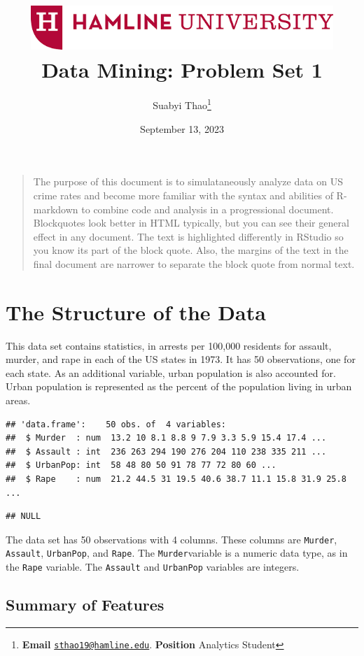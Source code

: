 \documentclass[
  12pt,
]{article}
\title{\includegraphics[width=4.5in,height=\textheight]{long_logo.png}\\
Data Mining: Problem Set 1}
\author{Suabyi Thao\footnote{\textbf{Email}
  \href{mailto:sthao19@hamline.edu}{\nolinkurl{sthao19@hamline.edu}}.
  \textbf{Position} Analytics Student}}
\date{September 13, 2023}
\begin{document}
\maketitle

\begin{quote}
The purpose of this document is to simulataneously analyze data on US
crime rates and become more familiar with the syntax and abilities of
R-markdown to combine code and analysis in a progressional document.
Blockquotes look better in HTML typically, but you can see their general
effect in any document. The text is highlighted differently in RStudio
so you know its part of the block quote. Also, the margins of the text
in the final document are narrower to separate the block quote from
normal text.
\end{quote}

\hypertarget{the-structure-of-the-data}{%
\section{The Structure of the Data}\label{the-structure-of-the-data}}

This data set contains statistics, in arrests per 100,000 residents for
assault, murder, and rape in each of the US states in 1973. It has 50
observations, one for each state. As an additional variable, urban
population is also accounted for. Urban population is represented as the
percent of the population living in urban areas.

\begin{verbatim}
## 'data.frame':    50 obs. of  4 variables:
##  $ Murder  : num  13.2 10 8.1 8.8 9 7.9 3.3 5.9 15.4 17.4 ...
##  $ Assault : int  236 263 294 190 276 204 110 238 335 211 ...
##  $ UrbanPop: int  58 48 80 50 91 78 77 72 80 60 ...
##  $ Rape    : num  21.2 44.5 31 19.5 40.6 38.7 11.1 15.8 31.9 25.8 ...
\end{verbatim}

\begin{verbatim}
## NULL
\end{verbatim}

The data set has 50 observations with 4 columns. These columns are
\texttt{Murder}, \texttt{Assault}, \texttt{UrbanPop}, and \texttt{Rape}.
The \texttt{Murder}variable is a numeric data type, as in the
\texttt{Rape} variable. The \texttt{Assault} and \texttt{UrbanPop}
variables are integers.

\hypertarget{summary-of-features}{%
\subsection{Summary of Features}\label{summary-of-features}}
\end{document}
